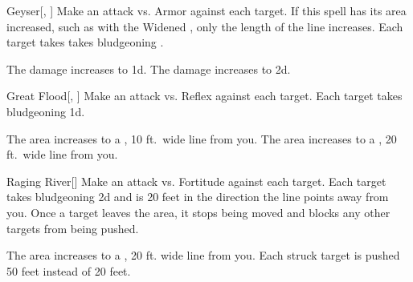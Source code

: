 \lowercase{\hypertarget{spell:Geyser}{}}\label{spell:Geyser}
\begin{freeability}[Rank 3]{\hypertarget{spell:Geyser}{Geyser}}[, ]
Make an attack vs. Armor against each target.
If this spell has its area increased, such as with the Widened , only the length of the line increases.
\hit Each target takes takes bludgeoning .

\rankline
{} The damage increases to  \plus1d.
 The damage increases to  \plus2d.
\end{freeability}
\vspace{0.25em}



\lowercase{\hypertarget{spell:Great Flood}{}}\label{spell:Great Flood}
\begin{freeability}[Rank 3]{\hypertarget{spell:Great Flood}{Great Flood}}[, ]
Make an attack vs. Reflex against each target.
\hit Each target takes bludgeoning  \minus1d.

\rankline
{} The area increases to a \areahuge, 10 ft.\ wide line from you.
 The area increases to a \areahuge, 20 ft.\ wide line from you.
\end{freeability}
\vspace{0.25em}



\lowercase{\hypertarget{spell:Raging River}{}}\label{spell:Raging River}
\begin{freeability}[Rank 3]{\hypertarget{spell:Raging River}{Raging River}}[]
Make an attack vs. Fortitude against each target.
\hit Each target takes bludgeoning  \minus2d and is  20 feet in the direction the line points away from you.
Once a target leaves the area, it stops being moved and blocks any other targets from being pushed.

\rankline
 The area increases to a \areahuge, 20 ft. wide line from you.
 Each struck target is pushed 50 feet instead of 20 feet.
\end{freeability}
\vspace{0.25em}



